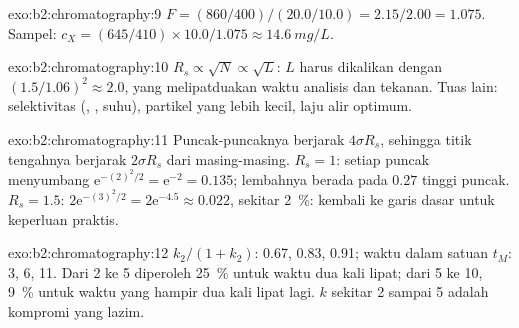 \begin{solution}{exo:b2:chromatography:9}
$F = (860/400)/(20.0/10.0) = 2.15/2.00 = 1.075$. Sampel: $c_X = (645/410) \times 10.0/1.075 \approx
\qty{14.6}{mg/L}$.
\end{solution}

\begin{solution}{exo:b2:chromatography:10}
$R_s \propto \sqrt N \propto \sqrt L$: $L$ harus dikalikan dengan $(1.5/1.06)^2 \approx 2.0$,
yang melipatduakan waktu analisis dan tekanan. Tuas lain: selektivitas
(, , suhu), partikel yang lebih kecil, laju alir
optimum.
\end{solution}

\begin{solution}{exo:b2:chromatography:11}
Puncak-puncaknya berjarak $4\sigma R_s$, sehingga titik tengahnya berjarak
$2\sigma R_s$ dari masing-masing. $R_s = 1$: setiap puncak
menyumbang $\mathrm e^{-(2)^2/2} = \mathrm e^{-2} = 0.135$; lembahnya berada pada $0.27$ tinggi puncak.
$R_s = 1.5$: $2\mathrm e^{-(3)^2/2} = 2\mathrm e^{-4.5} \approx 0.022$, sekitar 2~\%:
kembali ke garis dasar untuk keperluan praktis.
\end{solution}

\begin{solution}{exo:b2:chromatography:12}
$k_2/(1+k_2)$: 0.67, 0.83, 0.91; waktu dalam satuan $t_M$: 3, 6, 11. Dari 2
ke 5 diperoleh 25~\%  untuk waktu dua kali lipat; dari 5 ke 10,
9~\% untuk waktu yang hampir dua kali lipat lagi. $k$ sekitar 2 sampai 5
adalah kompromi yang lazim.
\end{solution}

